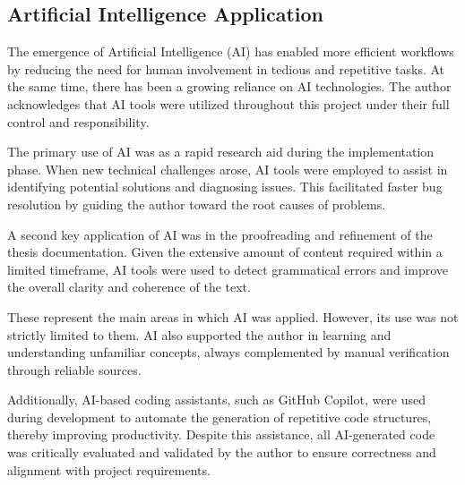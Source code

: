 \newpage

\subsection{Artificial Intelligence Application}

The emergence of Artificial Intelligence (AI) has enabled more efficient workflows by reducing the need for human involvement in tedious and repetitive tasks. At the same time, there has been a growing reliance on AI technologies. The author acknowledges that AI tools were utilized throughout this project under their full control and responsibility.

The primary use of AI was as a rapid research aid during the implementation phase. When new technical challenges arose, AI tools were employed to assist in identifying potential solutions and diagnosing issues. This facilitated faster bug resolution by guiding the author toward the root causes of problems.

A second key application of AI was in the proofreading and refinement of the thesis documentation. Given the extensive amount of content required within a limited timeframe, AI tools were used to detect grammatical errors and improve the overall clarity and coherence of the text.

These represent the main areas in which AI was applied. However, its use was not strictly limited to them. AI also supported the author in learning and understanding unfamiliar concepts, always complemented by manual verification through reliable sources. 

Additionally, AI-based coding assistants, such as GitHub Copilot, were used during development to automate the generation of repetitive code structures, thereby improving productivity. Despite this assistance, all AI-generated code was critically evaluated and validated by the author to ensure correctness and alignment with project requirements.
